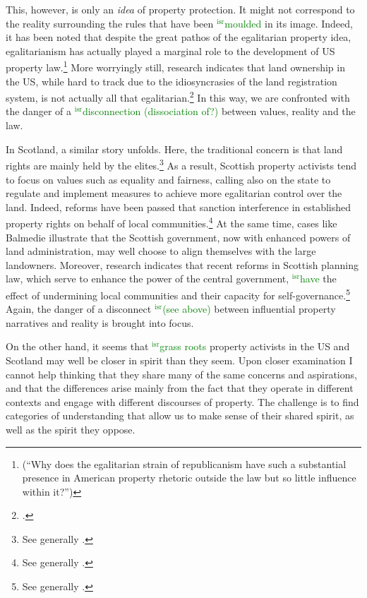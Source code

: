 \documentclass[12pt,a4paper]{book} %
\newcommand{\isr}[1]{\textcolor{green}{$^{\textrm{isr}}${#1}}}
\begin{document}
This, however, is only an {\it idea} of property protection. It might not correspond to the reality surrounding the rules that have been \isr{moulded} in its image. Indeed, it has been noted that despite the great pathos of the egalitarian property idea, egalitarianism has actually played a marginal role to the development of US property law.\footnote{\cite[361]{williams98} (``Why does the egalitarian strain of republicanism have such a substantial presence in American property rhetoric outside the law but so little influence within it?'')} More worryingly still, research indicates that land ownership in the US, while hard to track due to the idiosyncrasies of the land registration system, is not actually all that egalitarian.\footcite[246-247]{jacobs98} In this way, we are confronted with the danger of a \isr{disconnection (dissociation of?)} between  values, reality and the law.

In Scotland, a similar story unfolds. Here, the traditional concern is that land rights are mainly held by the elites.\footnote{See generally \cite{wightman96,wightman13}.} As a result, Scottish property activists tend to focus on values such as equality and fairness, calling also on the state to regulate and implement measures to achieve more egalitarian control over the land. Indeed, reforms have been passed that sanction interference in established property rights on behalf of local communities.\footnote{See generally \cite{lovett11,hoffman13}.} At the same time, cases like Balmedie illustrate that the Scottish government, now with enhanced powers of land administration, may well choose to align themselves with the large landowners. Moreover, research indicates that recent reforms in Scottish planning law, which serve to enhance the power of the central government, \isr{have} the effect of undermining local communities and their capacity for self-governance.\footnote{See generally \cite{pacione13,pacione14}.} Again, the danger of a disconnect \isr{(see above)} between influential property narratives and reality is brought into focus.

On the other hand, it seems that \isr{grass roots} property activists in the US and Scotland may well be closer in spirit than they seem. Upon closer examination I cannot help thinking that they share many of the same concerns and aspirations, and that the differences arise mainly from the fact that they operate in different contexts and engage with different discourses of property. The challenge is to find categories of understanding that allow us to make sense of their shared spirit, as well as the spirit they oppose.
\end{document}
